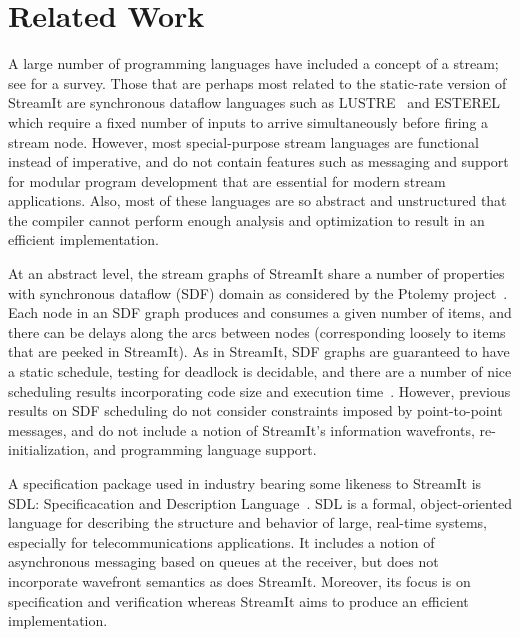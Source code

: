 \section{Related Work}
\label{sec:related}
A large number of programming languages have included a concept of a
stream; see \cite{survey97} for a survey.  Those that are perhaps most
related to the static-rate version of StreamIt are synchronous
dataflow languages such as LUSTRE~\cite{lustre} and
ESTEREL~\cite{esterel92} which require a fixed number of inputs to
arrive simultaneously before firing a stream node.  However, most
special-purpose stream languages are functional instead of imperative,
and do not contain features such as messaging and support for modular
program development that are essential for modern stream applications.
Also, most of these languages are so abstract and unstructured that
the compiler cannot perform enough analysis and optimization to result
in an efficient implementation.

At an abstract level, the stream graphs of StreamIt share a number of
properties with synchronous dataflow (SDF) domain as considered by the
Ptolemy project~\cite{ptolemyoverview}.  Each node in an SDF graph
produces and consumes a given number of items, and there can be delays
along the arcs between nodes (corresponding loosely to items that are
peeked in StreamIt).  As in StreamIt, SDF graphs are guaranteed to
have a static schedule, testing for deadlock is decidable, and there
are a number of nice scheduling results incorporating code size and
execution time~\cite{leesdf}.  However, previous results on SDF
scheduling do not consider constraints imposed by point-to-point
messages, and do not include a notion of StreamIt's information
wavefronts, re-initialization, and programming language support.

A specification package used in industry bearing some likeness to
StreamIt is SDL: Specificacation and Description
Language~\cite{sdlrec}.  SDL is a formal, object-oriented language for
describing the structure and behavior of large, real-time systems,
especially for telecommunications applications.  It includes a notion
of asynchronous messaging based on queues at the receiver, but does
not incorporate wavefront semantics as does StreamIt.  Moreover, its
focus is on specification and verification whereas StreamIt aims to
produce an efficient implementation.

